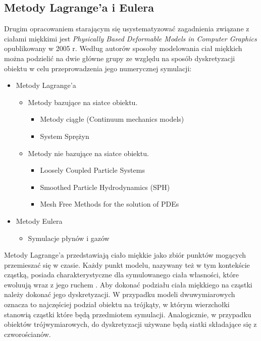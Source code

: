 \subsection{Metody Lagrange'a i Eulera}

Drugim opracowaniem starającym się usystematyzować zagadnienia związane z
ciałami miękkimi jest \textit{Physically Based Deformable Models in Computer
Graphics} opublikowany w 2005 r. Według autorów sposoby modelowania ciał miękkich można
podzielić na dwie główne grupy ze względu na sposób dyskretyzacji
obiektu w celu przeprowadzenia jego numerycznej symulacji:

\begin{itemize}
\item Metody Lagrange'a
	\begin{itemize}
	\item Metody bazujące na siatce obiektu.
		\begin{itemize}
			\item Metody ciągłe (Continuum mechanics models)
			\item System Sprężyn
		\end{itemize}
	\item Metody nie bazujące na siatce obiektu.
		\begin{itemize}
			\item Loosely Coupled Particle Systems 
			\item Smoothed Particle Hydrodynamics (SPH) 
			\item Mesh Free Methods for the solution of PDEs 
		\end{itemize}
	\end{itemize}
\item Metody Eulera
	\begin{itemize}
		\item Symulacje płynów i gazów
	\end{itemize}
\end{itemize}

Metody Lagrange'a przedstawiają ciało miękkie jako zbiór punktów mogących
przemieszać się w czasie. Każdy punkt modelu, nazywany też w tym kontekście cząstką,
posiada charakterystyczne dla symulowanego ciała własności, które ewoluują wraz z jego ruchem
\cite{pbdo}. Aby dokonać podziału ciała miękkiego na cząstki należy
dokonać jego dyskretyzacji. W przypadku modeli dwuwymiarowych oznacza to
najczęściej podział obiektu na trójkąty, w którym wierzchołki stanowią
cząstki które będą przedmiotem symulacji. Analogicznie, w przypadku obiektów
trójwymiarowych,
do dyskretyzacji używane będą siatki składające się z czworościanów.

